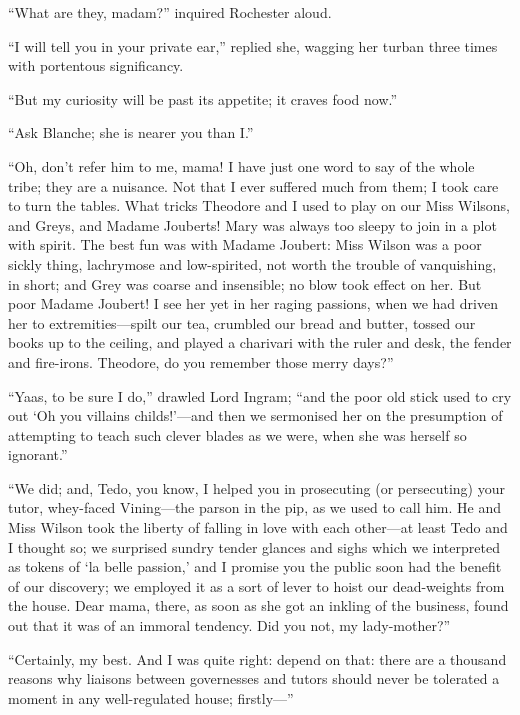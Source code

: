 \enquote{What are they, madam?} inquired \Mr{} Rochester aloud.

\enquote{I will tell you in your private ear,} replied she, wagging her
turban three times with portentous significancy.

\enquote{But my curiosity will be past its appetite; it craves food
	now.}

\enquote{Ask Blanche; she is nearer you than I\@.}

\enquote{Oh, don't refer him to me, mama! I have just one word to say
	of the whole tribe; they are a nuisance. Not that I ever suffered much
	from them; I took care to turn the tables. What tricks Theodore and I
	used to play on our Miss Wilsons, and \Mrs{} Greys, and Madame Jouberts!
	Mary was always too sleepy to join in a plot with spirit. The best fun
	was with Madame Joubert: Miss Wilson was a poor sickly thing, lachrymose
	and low-spirited, not worth the trouble of vanquishing, in short; and
	\Mrs{} Grey was coarse and insensible; no blow took effect on her. But
	poor Madame Joubert! I see her yet in her raging passions, when we had
	driven her to extremities---spilt our tea, crumbled our bread and
	butter, tossed our books up to the ceiling, and played a charivari with
	the ruler and desk, the fender and fire-irons. Theodore, do you
	remember those merry days?}

\enquote{Yaas, to be sure I do,} drawled Lord Ingram; \enquote{and the
	poor old stick used to cry out \enquote{Oh you villains childs!}---and
	then we sermonised her on the presumption of attempting to teach such
	clever blades as we were, when she was herself so ignorant.}

\enquote{We did; and, Tedo, you know, I helped you in prosecuting (or
	persecuting) your tutor, whey-faced \Mr{} Vining---the parson in the pip,
	as we used to call him. He and Miss Wilson took the liberty of falling
	in love with each other---at least Tedo and I thought so; we surprised
	sundry tender glances and sighs which we interpreted as tokens of
	\enquote{la belle passion,} and I promise you the public soon had the
	benefit of our discovery; we employed it as a sort of lever to hoist our
	dead-weights from the house. Dear mama, there, as soon as she got an
	inkling of the business, found out that it was of an immoral tendency.
	Did you not, my lady-mother?}

\enquote{Certainly, my best. And I was quite right: depend on that:
	there are a thousand reasons why liaisons between governesses and tutors
	should never be tolerated a moment in any well-regulated house;
	firstly---}


